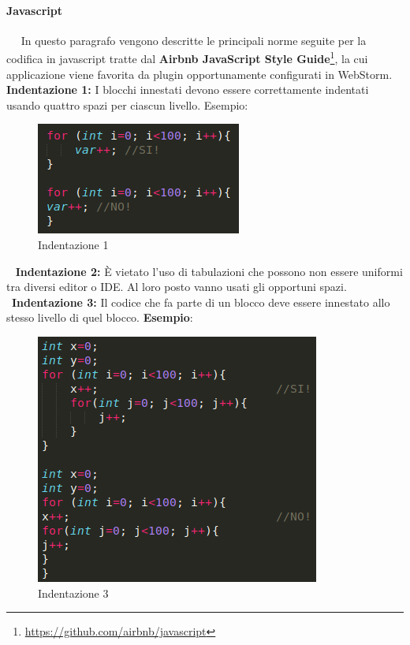 \paragraph{Javascript} ~\newline ~\newline
In questo paragrafo vengono descritte le principali norme seguite per la codifica in javascript tratte dal \textbf{Airbnb JavaScript Style Guide}\footnote{\url{https://github.com/airbnb/javascript}}, la cui applicazione viene favorita da plugin opportunamente configurati in WebStorm\pedice.\newline 
~\newline
\textbf{Indentazione 1:} I blocchi innestati devono essere correttamente indentati usando quattro spazi per ciascun livello. \newline
	Esempio:\newline
	\begin{figure}[!htbp]
		\centering
		\includegraphics{indentazione1.png}
		\caption{Indentazione 1}
	\end{figure}
~\newline	
	\textbf{Indentazione 2:} È vietato l'uso di tabulazioni che possono non essere uniformi tra diversi editor o IDE. Al loro posto vanno usati gli opportuni spazi. ~\newline 
	~\newline \textbf{Indentazione 3:} Il codice che fa parte di un blocco deve essere innestato allo stesso livello di quel blocco. \newline
	\textbf{Esempio}:
	\begin{figure}[!htbp]
		\centering
		\includegraphics[scale=0.7]{indentazione3.png}
		\caption{Indentazione 3}
	\end{figure}
